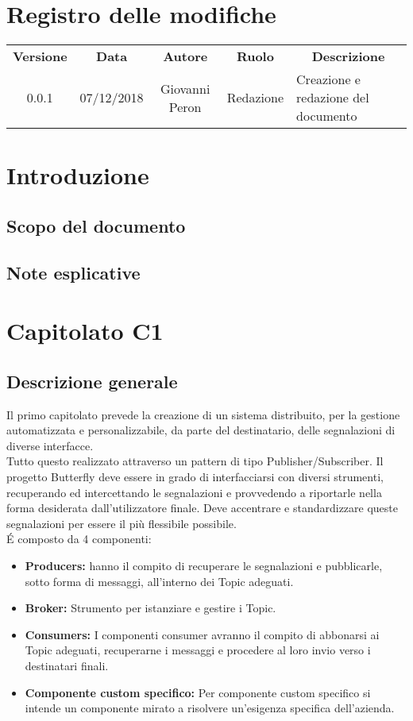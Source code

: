 \documentclass[11pt,a4paper]{article}
\begin{document}
	
	\tableofcontents
	\newpage
	\section*{\centering Registro delle modifiche}
	\begin{tabularx}{\textwidth}{ c | c | c | c | X }
		\rowcolor{LightBlue}
		\color{white}\bfseries Versione & \color{white}\bfseries Data & \color{white}\bfseries Autore & \color{white}\bfseries Ruolo & \multicolumn{1}{c}{\color{white}\bfseries Descrizione}\\[0.25cm]
		0.0.1 & 07/12/2018 & Giovanni Peron & Redazione & Creazione e redazione del documento  
	\end{tabularx}
	\newpage
	\section{Introduzione}
	\subsection{Scopo del documento}
	\subsection{Note esplicative}

	\newpage	
	\section{Capitolato C1}
	\subsection{Descrizione generale}
	Il primo capitolato prevede la creazione di un sistema distribuito, per la gestione automatizzata e personalizzabile, da parte del destinatario, delle segnalazioni di diverse interfacce.\\ 
	Tutto questo realizzato attraverso un pattern di tipo Publisher/Subscriber.
	Il progetto Butterfly deve essere in grado di interfacciarsi con diversi strumenti, recuperando ed intercettando le segnalazioni e provvedendo a riportarle nella forma desiderata dall'utilizzatore finale. Deve accentrare e standardizzare queste segnalazioni per essere il più flessibile possibile.\\
	\'E composto da 4 componenti:
	\begin{itemize}
		\item \textbf{Producers:} hanno il compito di recuperare le segnalazioni e pubblicarle, sotto forma di messaggi, all'interno dei Topic adeguati.
		\item \textbf{Broker:} Strumento per istanziare e gestire i Topic.
		\item \textbf{Consumers:} I componenti consumer avranno il compito di abbonarsi ai Topic adeguati, recuperarne i	messaggi e procedere al loro invio verso i destinatari finali.
		\item \textbf{Componente custom specifico:} Per componente custom specifico si intende un componente mirato a risolvere un'esigenza specifica dell'azienda. 
	\end{itemize}
\end{document}
